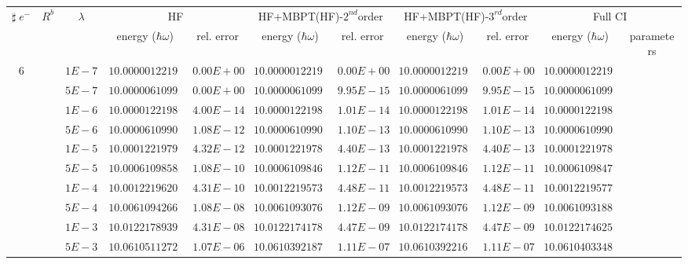 \begin{landscape}
\begin{table}[ht]
\centering      %
{\tiny
\begin{tabular}[c]{c|c|c|c|c|c|c|c|c|c|c} 
\toprule[1pt]
\multicolumn{1}{c|}{$\sharp \; e^{-}$}  & \multicolumn{1}{c|}{$R^b$} & \multicolumn{1}{c|}{$\lambda$} & \multicolumn{2}{c|}{HF}& \multicolumn{2}{c|}{HF+MBPT(HF)-$2^{nd}$order}& \multicolumn{2}{c|}{HF+MBPT(HF)-$3^{rd}$order}& \multicolumn{2}{c}{Full CI}\\
\multicolumn{1}{c|}{}  & \multicolumn{1}{c|}{} & \multicolumn{1}{c|}{} & \multicolumn{1}{c|}{energy ($\hbar \omega$)}& \multicolumn{1}{c|}{rel. error} & \multicolumn{1}{c|}{energy ($\hbar \omega$)}& \multicolumn{1}{c|}{rel. error}& \multicolumn{1}{c|}{energy ($\hbar \omega$)} &\multicolumn{1}{c|}{rel. error}& \multicolumn{1}{c|}{energy ($\hbar \omega$)}& \multicolumn{1}{c}{parameters}\\
\hline
\multirow{56}{*}{6} & &$1E-7$ & $10.000001221981$ & $0.00E+00$ & $10.000001221981$ & $0.00E+00$ & $10.000001221981$ & $0.00E+00$ & $10.000001221981$ &  \\
& &$5E-7$ & $10.000006109906$ & $0.00E+00$ & $10.000006109906$ & $9.95E-15$ & $10.000006109906$ & $9.95E-15$ & $10.000006109906$ &  \\
& &$1E-6$ & $10.000012219811$ & $4.00E-14$ & $10.000012219810$ & $1.01E-14$ & $10.000012219810$ & $1.01E-14$ & $10.000012219811$ &  \\
& &$5E-6$ & $10.000061099016$ & $1.08E-12$ & $10.000061099004$ & $1.10E-13$ & $10.000061099004$ & $1.10E-13$ & $10.000061099005$ &  \\
& &$1E-5$ & $10.000122197937$ & $4.32E-12$ & $10.000122197889$ & $4.40E-13$ & $10.000122197889$ & $4.40E-13$ & $10.000122197893$ &  \\
& &$5E-5$ & $10.000610985844$ & $1.08E-10$ & $10.000610984654$ & $1.12E-11$ & $10.000610984654$ & $1.12E-11$ & $10.000610984766$ &  \\
& &$1E-4$ & $10.001221962092$ & $4.31E-10$ & $10.001221957331$ & $4.48E-11$ & $10.001221957331$ & $4.48E-11$ & $10.001221957779$ &  \\
& &$5E-4$ & $10.006109426662$ & $1.08E-08$ & $10.006109307623$ & $1.12E-09$ & $10.006109307626$ & $1.12E-09$ & $10.006109318814$ &  \\
& &$1E-3$ & $10.012217893980$ & $4.31E-08$ & $10.012217417803$ & $4.47E-09$ & $10.012217417826$ & $4.47E-09$ & $10.012217462554$ &  \\
& &$5E-3$ & $10.061051127218$ & $1.07E-06$ & $10.061039218756$ & $1.11E-07$ & $10.061039221609$ & $1.11E-07$ & $10.061040334895$ &  \\

\end{tabular}}
\end{table}
\end{landscape}
